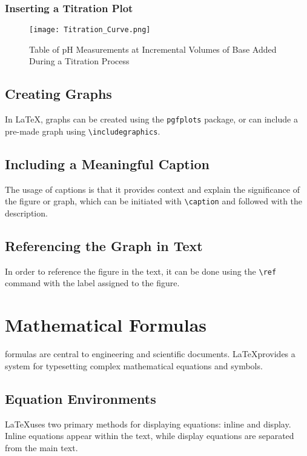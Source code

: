 \documentclass[12pt,journal,compsoc]{IEEEtran}
\begin{document}
\subsubsection{Inserting a Titration Plot}
\begin{figure}[htbp]
  \centering
  \texttt{[image: Titration\_Curve.png]}
  \caption{Table of pH Measurements at Incremental Volumes of Base Added During a Titration Process}
  \label{fig:titrationplot}
\end{figure}

\subsection{Creating Graphs}
In \LaTeX, graphs can be created using the \texttt{pgfplots} package, or can include a pre-made graph using \texttt{\textbackslash includegraphics}.

\subsection{Including a Meaningful Caption}
The usage of captions is that it provides context and explain the significance of the figure or graph, which can be initiated with \texttt{\textbackslash caption} and followed with the description.

\subsection{Referencing the Graph in Text}
In order to reference the figure in the text, it can be done using the \texttt{\textbackslash ref} command with the label assigned to the figure.

\section{Mathematical Formulas}

 formulas are central to engineering and scientific documents. \LaTeX provides a system for typesetting complex mathematical equations and symbols.  

\subsection{Equation Environments}
\LaTeX uses two primary methods for displaying equations: inline and display. Inline equations appear within the text, while display equations are separated from the main text.
\end{document}

